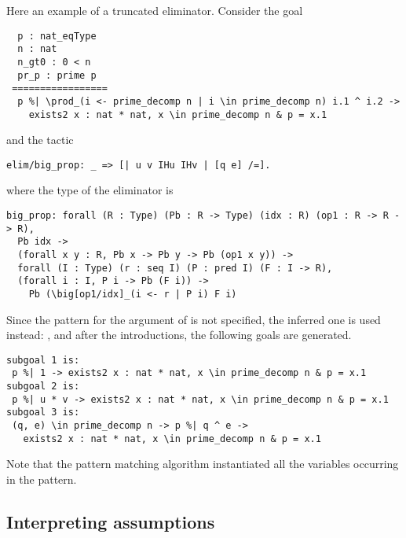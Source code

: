 Here an example of a truncated eliminator. Consider the goal
\begin{lstlisting}
  p : nat_eqType
  n : nat
  n_gt0 : 0 < n
  pr_p : prime p
 =================
  p %| \prod_(i <- prime_decomp n | i \in prime_decomp n) i.1 ^ i.2 ->
    exists2 x : nat * nat, x \in prime_decomp n & p = x.1
\end{lstlisting}
and the tactic
\begin{lstlisting}
elim/big_prop: _ => [| u v IHu IHv | [q e] /=].
\end{lstlisting}
where the type of the eliminator is
\begin{lstlisting}
big_prop: forall (R : Type) (Pb : R -> Type) (idx : R) (op1 : R -> R -> R),
  Pb idx ->
  (forall x y : R, Pb x -> Pb y -> Pb (op1 x y)) ->
  forall (I : Type) (r : seq I) (P : pred I) (F : I -> R),
  (forall i : I, P i -> Pb (F i)) ->
    Pb (\big[op1/idx]_(i <- r | P i) F i)
\end{lstlisting}
Since the pattern for the argument of  is not specified, the inferred one
is used instead: , and after the 
introductions, the following goals are generated.
\begin{lstlisting}
subgoal 1 is:
 p %| 1 -> exists2 x : nat * nat, x \in prime_decomp n & p = x.1
subgoal 2 is:
 p %| u * v -> exists2 x : nat * nat, x \in prime_decomp n & p = x.1
subgoal 3 is:
 (q, e) \in prime_decomp n -> p %| q ^ e -> 
   exists2 x : nat * nat, x \in prime_decomp n & p = x.1
\end{lstlisting}
Note that the pattern matching algorithm instantiated all the variables
occurring in the pattern.

\subsection{Interpreting assumptions}\label{ssec:assumpinterp}

